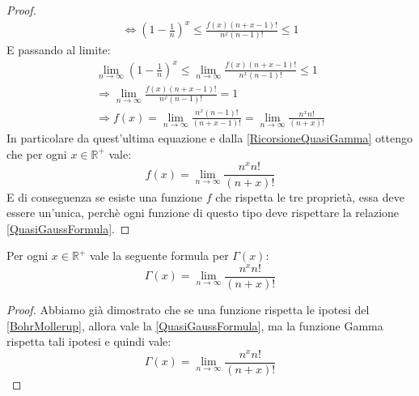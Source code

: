 \begin{proof}
\begin{gather*}
  \iff \left(1-\frac{1}{n}\right)^x \le  \frac{f(x)(n+x-1)!}{n^x(n-1)!} \le 1
\end{gather*}
E passando al limite:
 \begin{gather*}
  \lim_{n\rightarrow \infty} \left(1-\frac{1}{n}\right)^x \le \lim_{n\rightarrow \infty}  \frac{f(x)(n+x-1)!}{n^x(n-1)!} \le 1 \\
  \Longrightarrow \lim_{n\rightarrow \infty} \frac{f(x)(n+x-1)!}{n^x(n-1)!}  = 1 \\
  \Longrightarrow f(x) = \lim_{n\rightarrow \infty} \frac{n^x(n-1)!}{(n+x-1)!}=\lim_{n\rightarrow \infty} \frac{n^xn!}{(n+x)!}
 \end{gather*}
In particolare da quest'ultima equazione e dalla \cref{RicorsioneQuasiGamma} ottengo che per ogni $x\in\mathbb{R}^+$ vale:
\begin{equation}\label{QuasiGaussFormula}
 f(x)=\lim_{n\rightarrow \infty} \frac{n^xn!}{(n+x)!}
\end{equation}
E di conseguenza se esiste una funzione $f$ che rispetta le tre proprietà, essa deve essere un'unica, perchè ogni
funzione di questo tipo deve rispettare la relazione \cref{QuasiGaussFormula}.
 \end{proof}
 
 \begin{corollary}\label{GaussFormula}
 Per ogni $x\in\mathbb{R^+}$ vale la seguente formula per $\Gamma(x)$:
 \begin{equation*}
  \Gamma(x)=\lim_{n\rightarrow \infty} \frac{n^xn!}{(n+x)!}
 \end{equation*}
 \end{corollary}
 \begin{proof}
  Abbiamo già dimostrato che se una funzione rispetta le ipotesi del \cref{BohrMollerup}, allora vale la 
  \cref{QuasiGaussFormula}, ma la funzione Gamma rispetta tali ipotesi e quindi vale:
  \begin{equation*}
  \Gamma(x)=\lim_{n\rightarrow \infty} \frac{n^xn!}{(n+x)!}
 \end{equation*}
 \end{proof}





